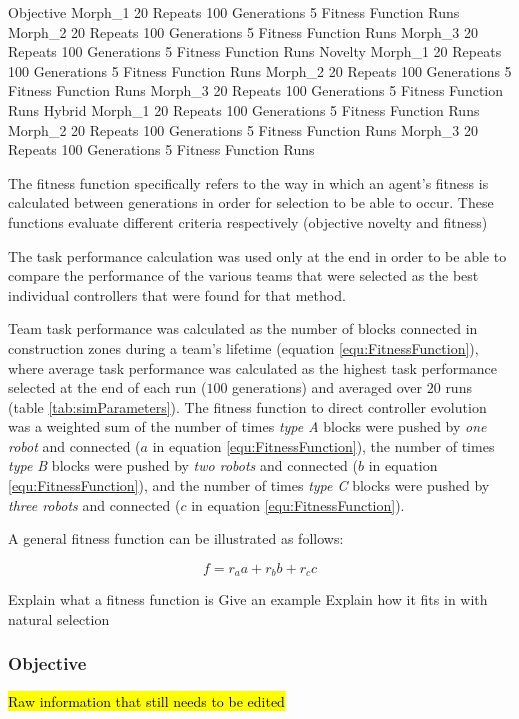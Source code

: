 \documentclass[conference]{IEEEtran}
\begin{document}
Objective
	Morph_1
		20 Repeats
			100 Generations
				5 Fitness Function Runs
	Morph_2
		20 Repeats
			100 Generations
				5 Fitness Function Runs
	Morph_3
		20 Repeats
			100 Generations
				5 Fitness Function Runs
Novelty
	Morph_1
		20 Repeats
			100 Generations
				5 Fitness Function Runs
	Morph_2
		20 Repeats
			100 Generations
				5 Fitness Function Runs
	Morph_3
		20 Repeats
			100 Generations
				5 Fitness Function Runs
Hybrid
	Morph_1
		20 Repeats
			100 Generations
				5 Fitness Function Runs
	Morph_2
		20 Repeats
			100 Generations
				5 Fitness Function Runs
	Morph_3
		20 Repeats
			100 Generations
				5 Fitness Function Runs
	

The fitness function specifically refers to the way in which an agent's fitness is calculated between generations in order for selection to be able to occur. These functions evaluate different criteria respectively (objective novelty and fitness) 

The task performance calculation was used only at the end in order to be able to compare the performance of the various teams that were selected as the best individual controllers that were found for that method.

Team task performance was calculated as the number of blocks connected in construction zones
during a team's lifetime (equation \ref{equ:FitnessFunction}),
where average task performance was calculated as the highest task
performance selected at the end of each run ($100$ generations) and averaged over $20$ runs
(table \ref{tab:simParameters}).
The fitness function to direct controller evolution was a weighted sum of
the number of times \textit{type A} blocks were pushed by \textit{one robot}
and connected (\(a\) in equation \ref{equ:FitnessFunction}), the number of times \textit{type B} blocks were pushed
by \textit{two robots} and connected (\(b\) in equation \ref{equ:FitnessFunction}),
and the number of times \textit{type C} blocks were pushed by \textit{three robots}
and connected (\(c\) in equation \ref{equ:FitnessFunction}).

A general fitness function can be illustrated as follows: 

\begin{equation}\label{equ:FitnessFunction}
f = r_a a + r_b b + r_c c
\end{equation}

Explain what a fitness function is
Give an example
Explain how it fits in with natural selection

\subsubsection{Objective}
\hl{Raw information that still needs to be edited}
\end{document}
